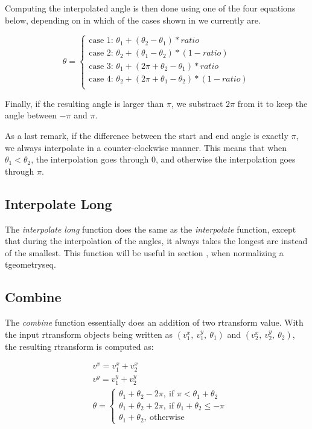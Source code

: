 Computing the interpolated angle is then done using one of the four equations below, depending on in which of the cases shown in  we currently are.

\[
    \theta = 
    \begin{cases}
        \text{case 1: } \theta_1 + (\theta_2 - \theta_1)*ratio \\
        \text{case 2: } \theta_2 + (\theta_1 - \theta_2)*(1 - ratio) \\
        \text{case 3: } \theta_1 + (2\pi + \theta_2 - \theta_1)*ratio \\
        \text{case 4: } \theta_2 + (2\pi + \theta_1 - \theta_2)*(1 - ratio) \\
    \end{cases}
\]

Finally, if the resulting angle is larger than $\pi$, we substract $2\pi$ from it to keep the angle between $-\pi$ and $\pi$.

As a last remark, if the difference between the start and end angle is exactly $\pi$, we always interpolate in a counter-clockwise manner. This means that when $\theta_1 < \theta_2$, the interpolation goes through $0$, and otherwise the interpolation goes through $\pi$.


\subsection{Interpolate Long}

The \textit{interpolate long} function does the same as the \textit{interpolate} function, except that during the interpolation of the angles, it always takes the longest arc instead of the smallest. This function will be useful in section , when normalizing a tgeometryseq.

\subsection{Combine}

The \textit{combine} function essentially does an addition of two rtransform value. With the input rtransform objects being written as $(v_1^x,\ v_1^y,\ \theta_1)$ and $(v_2^x,\ v_2^y,\ \theta_2)$, the resulting rtransform is computed as:

\begin{align*}
        & v^x = v_1^x + v_2^x \\
        & v^y = v_1^y + v_2^y \\
        & \theta = 
        \begin{cases}
            \theta_1 + \theta_2 - 2\pi,\ \text{if } \pi < \theta_1 + \theta_2 \\
            \theta_1 + \theta_2 + 2\pi,\ \text{if } \theta_1 + \theta_2 \le -\pi \\
            \theta_1 + \theta_2,\ \text{otherwise}
        \end{cases}
\end{align*}

